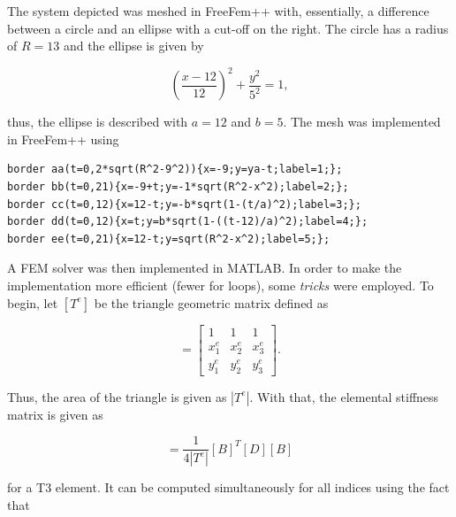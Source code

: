 \documentclass[11pt,fleqn]{article}
\begin{document}
The system depicted was meshed in FreeFem++ with, essentially, a difference between a circle and an ellipse with a cut-off on the right. The circle has a radius of $R = 13$ and the ellipse is given by 

\begin{equation}
	\left(\frac{x-12}{12}\right)^2 + \frac{y^2}{5^2} = 1,
\end{equation}

thus, the ellipse is described with $a = 12$ and $b = 5$. The mesh was implemented in FreeFem++ using 

\begin{verbatim}
border aa(t=0,2*sqrt(R^2-9^2)){x=-9;y=ya-t;label=1;};
border bb(t=0,21){x=-9+t;y=-1*sqrt(R^2-x^2);label=2;};
border cc(t=0,12){x=12-t;y=-b*sqrt(1-(t/a)^2);label=3;};
border dd(t=0,12){x=t;y=b*sqrt(1-((t-12)/a)^2);label=4;};
border ee(t=0,21){x=12-t;y=sqrt(R^2-x^2);label=5;};
\end{verbatim}

A FEM solver was then implemented in MATLAB. In order to make the implementation more efficient (fewer for loops), some \emph{tricks} were employed. To begin, let $[T^e]$ be the triangle geometric matrix defined as 

\begin{equation}
	[T^e] = 
\left[
\begin{array}{ccc}
1 & 1 & 1 \\
x^e_1 & x^e_2 & x^e_3 \\
y^e_1 & y^e_2 & y^e_3
\end{array}
\right].
\end{equation}

Thus, the area of the triangle is given as $|T^e|$. With that, the elemental stiffness matrix is given as

\begin{equation}
	[K^e] = \dfrac{1}{4|T^e|}[B]^T[D][B]
\end{equation}

for a T3 element. It can be computed simultaneously for all indices using the fact that
\end{document}
